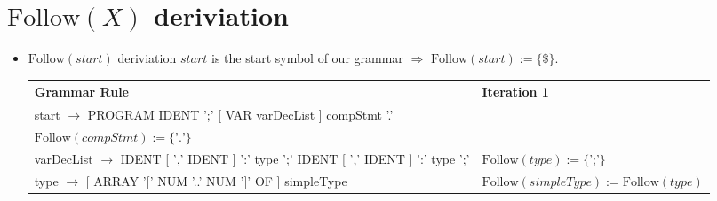 \documentclass[8pt]{scrartcl}
\newcommand{\First}[1]{\mathrm{First}(#1)}
\newcommand{\Follow}[1]{\mathrm{Follow}(#1)}
\newcommand{\epsset}{\{\varepsilon\}}
\begin{document}
    \section{$\Follow{X}$ \textbf{deriviation}}
        \begin{itemize}
            \item $\Follow{start}$ deriviation\newline
                $start$ is the start symbol of our grammar $\Rightarrow$ $\Follow{start} := \{\$\}$.\newline
                \begin{tabular}{|l|l|}
                \hline
                \textbf{Grammar Rule} & \textbf{Iteration 1}\\
                \hline
                start $\rightarrow$ PROGRAM IDENT ';' [ VAR varDecList ] compStmt '.' & \makecell[l]{$\Follow{varDecList} := \First{compStmt} \setminus \epsset = \{BEGIN\}$\\
                                                                                 $\Follow{compStmt} := \{\text{'.'}\}$
                                                                                }\\
                \hline
                varDecList $\rightarrow$ IDENT [ ',' IDENT ] ':' type ';' { IDENT [ ',' IDENT ] ':' type ';' } & $\Follow{type} := \{\text{';'}\}$\\
                \hline
                type $\rightarrow$ [ ARRAY '$[$' NUM '..' NUM '$]$' OF ] simpleType & $\Follow{simpleType} := \Follow{type}$\\
                \hline
                \end{tabular}
        \end{itemize}
\end{document}
